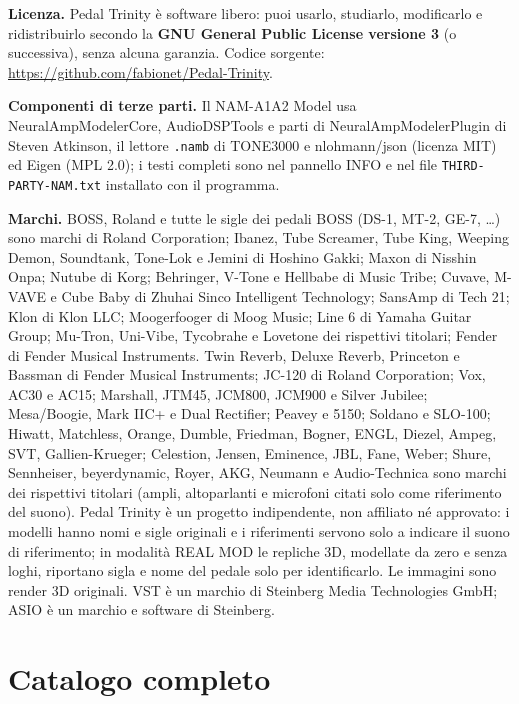 \documentclass[11pt,a4paper]{article}
\begin{document}
\textbf{Licenza.} Pedal Trinity è software libero: puoi usarlo, studiarlo, modificarlo e
ridistribuirlo secondo la \textbf{GNU General Public License versione 3} (o successiva), senza alcuna
garanzia. Codice sorgente: \url{https://github.com/fabionet/Pedal-Trinity}.

\textbf{Componenti di terze parti.} Il NAM-A1A2 Model usa NeuralAmpModelerCore, AudioDSPTools e parti
di NeuralAmpModelerPlugin di Steven Atkinson, il lettore \texttt{.namb} di TONE3000 e nlohmann/json
(licenza MIT) ed Eigen (MPL 2.0); i testi completi sono nel pannello INFO e nel file
\texttt{THIRD-PARTY-NAM.txt} installato con il programma.

\textbf{Marchi.} BOSS, Roland e tutte le sigle dei pedali BOSS (DS-1, MT-2, GE-7, \dots) sono marchi
di Roland Corporation; Ibanez, Tube Screamer, Tube King, Weeping Demon, Soundtank, Tone-Lok e Jemini di Hoshino
Gakki; Maxon di Nisshin Onpa; Nutube di Korg; Behringer, V-Tone e Hellbabe di Music Tribe; Cuvave, M-VAVE e Cube Baby
di Zhuhai Sinco Intelligent Technology; SansAmp di Tech 21; Klon di Klon LLC; Moogerfooger di Moog Music; Line 6 di Yamaha
Guitar Group; Mu-Tron, Uni-Vibe, Tycobrahe e Lovetone dei rispettivi titolari; Fender di Fender Musical Instruments.
Twin Reverb, Deluxe Reverb, Princeton e Bassman di Fender Musical Instruments; JC-120 di Roland Corporation; Vox, AC30 e AC15; Marshall, JTM45, JCM800, JCM900 e Silver Jubilee; Mesa/Boogie, Mark IIC+ e Dual Rectifier; Peavey e 5150; Soldano e SLO-100; Hiwatt, Matchless, Orange, Dumble, Friedman, Bogner, ENGL, Diezel, Ampeg, SVT, Gallien-Krueger; Celestion, Jensen, Eminence, JBL, Fane, Weber; Shure, Sennheiser, beyerdynamic, Royer, AKG, Neumann e Audio-Technica sono marchi dei rispettivi titolari (ampli, altoparlanti e microfoni citati solo come riferimento del suono).
Pedal Trinity è un progetto indipendente, non affiliato né approvato: i modelli hanno nomi e sigle
originali e i riferimenti servono solo a indicare il suono di riferimento; in modalità REAL MOD le
repliche 3D, modellate da zero e senza loghi, riportano sigla e nome del pedale solo per identificarlo. Le immagini sono render 3D
originali. VST è un marchio di Steinberg Media Technologies GmbH; ASIO è un marchio e software di Steinberg.

\clearpage
\section{Catalogo completo}\label{sec:catalogo}
{\small

}
\end{document}
